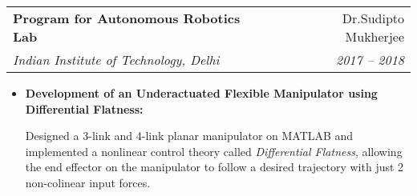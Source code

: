 \documentclass[letterpaper,11pt]{article}
\makeatletter
\newcommand{\resumeItem}[2]{
  \item\small{
    \textbf{#1:}{\par #2 \vspace{-2pt}}
  }
}
\newcommand{\resumeSubheading}[4]{
  \vspace{-1pt}\item
    \begin{tabular*}{0.97\textwidth}{l@{\extracolsep{\fill}}r}
      \textbf{#1} & \small{#2} \\
      \textit{\small#3} & \textit{\small #4} \\
    \end{tabular*}\vspace{-5pt}
}
\newcommand{\resumeItemListStart}{\begin{itemize}}
\newcommand{\resumeItemListEnd}{\end{itemize}\vspace{-5pt}}
\makeatother
\begin{document}
    \resumeSubheading
      {Program for Autonomous Robotics Lab}{Dr.Sudipto Mukherjee}
      {Indian Institute of Technology, Delhi}{2017 – 2018}
      \resumeItemListStart
        \resumeItem{Development of an Underactuated Flexible Manipulator using Differential Flatness}
        {
          \begin{flushleft}
            Designed a 3-link and 4-link planar manipulator on MATLAB and implemented a nonlinear control theory called \textit{Differential Flatness}, allowing the end effector on the manipulator to follow a desired trajectory with just 2 non-colinear input forces.
          \end{flushleft}
        }
      \resumeItemListEnd

\end{document}

